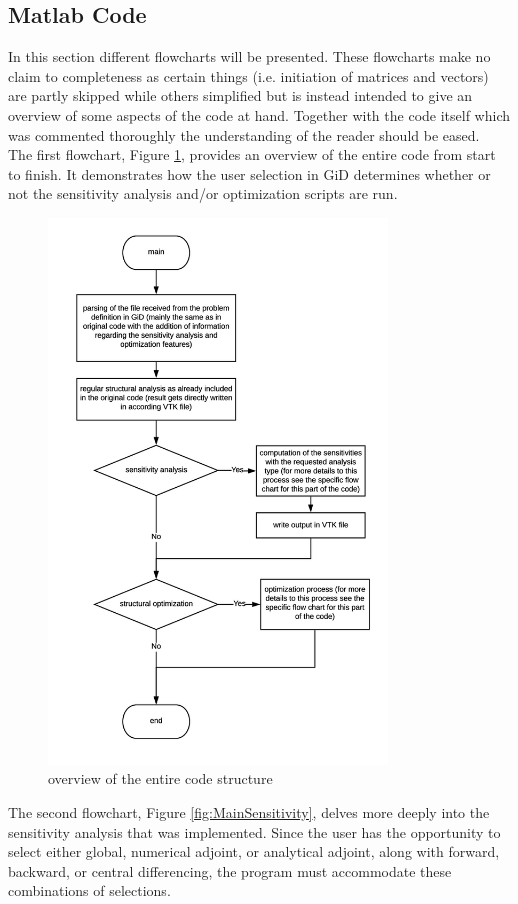 \subsection{Matlab Code} \label{section:appendix_matlab}
In this section different flowcharts will be presented. These flowcharts make no claim to completeness as certain things (i.e. initiation of matrices and vectors) are partly skipped while others simplified but is instead intended to give an overview of some aspects of the code at hand. Together with the code itself which was commented thoroughly the understanding of the reader should be eased.\\[3pt]
The first flowchart, Figure \ref{fig:Main}, provides an overview of the entire code from start to finish. It demonstrates how the user selection in GiD determines whether or not the sensitivity analysis and/or optimization scripts are run.\\[3pt]
\begin{figure}[ht]
  \centering
  \includegraphics[width=90mm]{images/main.png}
  \caption{overview of the entire code structure}
  \label{fig:Main}
\end{figure}
The second flowchart, Figure \ref{fig:MainSensitivity}, delves more deeply into the sensitivity analysis that was implemented. Since the user has the opportunity to select either global, numerical adjoint, or analytical adjoint, along with forward, backward, or central differencing, the program must accommodate these combinations of selections.\\[3pt]
